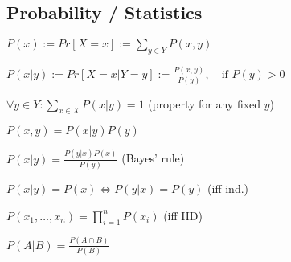 \subsection*{Probability / Statistics}
\begin{inparaitem}[\color{red}\textopenbullet]
	\item $P(x) := Pr[X = x] := \sum_{y \in Y} P(x, y)$
	\item $P(x|y) := Pr[X = x | Y = y] := \frac{P(x,y)}{P(y)},\quad \text{if } P(y) > 0$
	\item $\forall y \in Y: \sum_{x \in X} P(x|y) = 1$ (property for any fixed $y$)
	\item $P(x, y) = P(x|y) P(y)$
	\item $P(x|y) = \frac{P(y|x)P(x)}{P(y)}$ (Bayes' rule)
	\item $P(x|y) = P(x) \Leftrightarrow P(y|x) = P(y)$ (iff ind.)
	\item $P(x_1, \ldots, x_n) = \prod_{i=1}^n P(x_i)$ (iff IID)
    \item $P(A|B) = \frac{P(A \cap B)}{P(B)}$
\end{inparaitem}